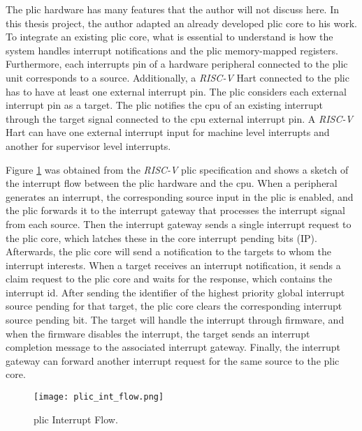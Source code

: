 The \acrshort{plic} hardware has many features that the author will not discuss here. In this thesis project, the author adapted an already developed \acrshort{plic} core to his work. To integrate an existing \acrshort{plic} core, what is essential to understand is how the system handles interrupt notifications and the \acrshort{plic} memory-mapped registers. Furthermore, each interrupts pin of a hardware peripheral connected to the \acrshort{plic} unit corresponds to a source. Additionally, a \textit{RISC-V} Hart connected to the \acrshort{plic} has to have at least one external interrupt pin. The \acrshort{plic} considers each external interrupt pin as a target. The \acrshort{plic} notifies the \acrshort{cpu} of an existing interrupt through the target signal connected to the \acrshort{cpu} external interrupt pin. A \textit{RISC-V} Hart can have one external interrupt input for \acrlong{machine} level interrupts and another for \acrlong{supervisor} level interrupts.

Figure \ref{fig:plic_int_flow} was obtained from the \textit{RISC-V} \acrshort{plic} specification and shows a sketch of the interrupt flow between the \acrshort{plic} hardware and the \acrshort{cpu}. When a peripheral generates an interrupt, the corresponding source input in the \acrshort{plic} is enabled, and the \acrshort{plic} forwards it to the interrupt gateway that processes the interrupt signal from each source. Then the interrupt gateway sends a single interrupt request to the \acrshort{plic} core, which latches these in the core interrupt pending bits (IP). Afterwards, the \acrshort{plic} core will send a notification to the targets to whom the interrupt interests. When a target receives an interrupt notification, it sends a claim request to the \acrshort{plic} core and waits for the response, which contains the interrupt id. After sending the identifier of the highest priority global interrupt source pending for that target, the \acrshort{plic} core clears the corresponding interrupt source pending bit. The target will handle the interrupt through firmware, and when the firmware disables the interrupt, the target sends an interrupt completion message to the associated interrupt gateway. Finally, the interrupt gateway can forward another interrupt request for the same source to the \acrshort{plic} core.

\begin{figure}[!ht]
    \centering
    \texttt{[image: plic\_int\_flow.png]}
    \caption{\acrshort{plic} Interrupt Flow.}
    \label{fig:plic_int_flow}
\end{figure}

